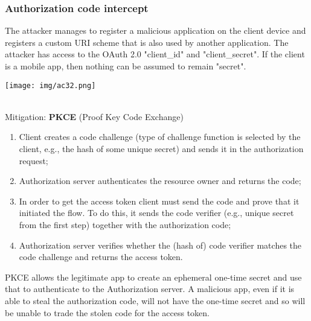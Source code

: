 \documentclass[a4paper, 10pt, titlepage]{article}
\begin{document}
\subsubsection{Authorization code intercept}
\begin{minipage}{0.5\textwidth}
The attacker manages to register a malicious application on the client device and registers a custom URI scheme that is also used by another application. The attacker has access to the OAuth 2.0 "client\_id" and "client\_secret". If the client is a mobile app, then nothing can be assumed to remain "secret".
\end{minipage}
\hfill
\begin{minipage}{0.45\textwidth}
\begin{center}
\texttt{[image: img/ac32.png]}
\end{center}
\end{minipage}\medskip\\
Mitigation: \textbf{PKCE} (Proof Key Code Exchange)
\begin{enumerate} 
\item Client creates a code challenge (type of challenge function is selected by the client, e.g., the hash of some unique secret) and
sends it in the authorization request;
\item Authorization server authenticates the resource owner and returns the code;
\item In order to get the access token client must send the code and prove that it initiated the flow. To do this, it sends the code verifier (e.g., unique secret from the first step) together with the authorization code;
\item Authorization server verifies whether the (hash of) code verifier matches the code challenge and returns the access token.
\end{enumerate}
PKCE allows the legitimate app to create an ephemeral one-time secret
and use that to authenticate to the Authorization server. A malicious app, even if it is able to steal the authorization code, will not
have the one-time secret and so will be unable to trade the stolen code for the access token.
\end{document}
